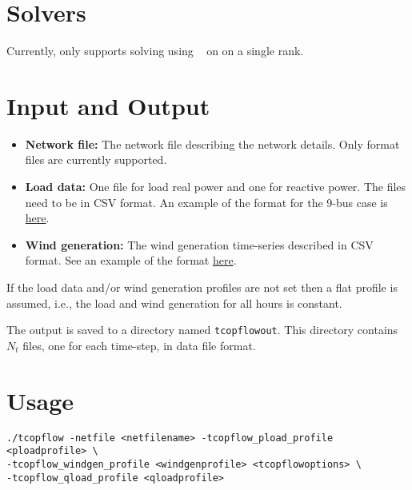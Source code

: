 \section{Solvers}\label{sec:tcopflow_solvers}%
Currently, \exago only supports solving \tcopflow using \ipopt~ on on a single rank. %

\section{Input and Output}
\begin{itemize}
    \item \textbf{Network file:} The network file describing the network details. Only \matpower format files are currently supported.
    \item \textbf{Load data:} One file for load real power and one for reactive power. The files need to be in CSV format. An example of the format for the 9-bus case is \href{https://gitlab.pnnl.gov/exasgd/frameworks/exago/-/tree/master/datafiles/case9}{here}.
    \item \textbf{Wind generation:} The wind generation time-series described in CSV format. See an example of the format \href{https://gitlab.pnnl.gov/exasgd/frameworks/exago/-/tree/master/datafiles/case9}{here}.
\end{itemize}
If the load data and/or wind generation profiles are not set then a flat profile is assumed, i.e., the load and wind generation for all hours is constant.

The \tcopflow output is saved to a directory named \texttt{tcopflowout}. This directory contains $N_t$ files, one for each time-step, in \matpower data file format.

\section{Usage}
\begin{lstlisting}
./tcopflow -netfile <netfilename> -tcopflow_pload_profile <ploadprofile> \
-tcopflow_windgen_profile <windgenprofile> <tcopflowoptions> \
-tcopflow_qload_profile <qloadprofile>
\end{lstlisting}
